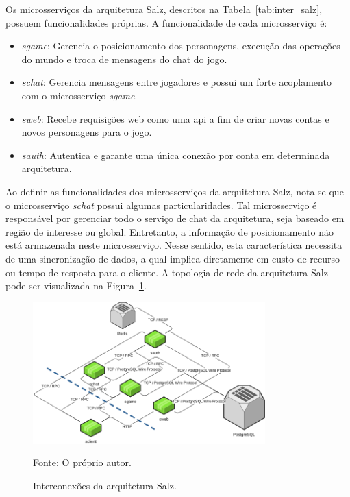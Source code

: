 Os microsserviços da arquitetura Salz, descritos na Tabela~\ref{tab:inter_salz}, possuem funcionalidades próprias.
%
A funcionalidade de cada microsserviço é:



\begin{itemize}
  \item \textit{sgame}: Gerencia o posicionamento dos personagens, execução das operações do mundo e troca de mensagens do chat do jogo.
  \item \textit{schat}: Gerencia mensagens entre jogadores e possui um forte acoplamento com o microsserviço \textit{sgame}.
  \item \textit{sweb}: Recebe requisições web como uma \ac{api} a fim de criar novas contas e novos personagens para o jogo.
  \item \textit{sauth}: Autentica e garante uma única conexão por conta em determinada arquitetura.
\end{itemize}



Ao definir as funcionalidades dos microsserviços da arquitetura Salz, nota-se que o microsserviço \textit{schat} possui algumas particularidades.
%
Tal microsserviço é responsável por gerenciar todo o serviço de chat da arquitetura, seja baseado em região de interesse ou global.
%
Entretanto, a informação de posicionamento não está armazenada neste microsserviço.
%
Nesse sentido, esta característica necessita de uma sincronização de dados, a qual implica diretamente em custo de recurso ou tempo de resposta para o cliente.
%
A topologia de rede da arquitetura Salz pode ser visualizada na Figura~\ref{fig:interconexao_salz}.



\begin{figure}[htb!]
  \caption{Interconexões da arquitetura Salz.}
  \label{fig:interconexao_salz}
  \includegraphics[width=0.8\textwidth]{figuras/interconexoes/salz.png}
  \centering

  Fonte: O próprio autor.
\end{figure}



